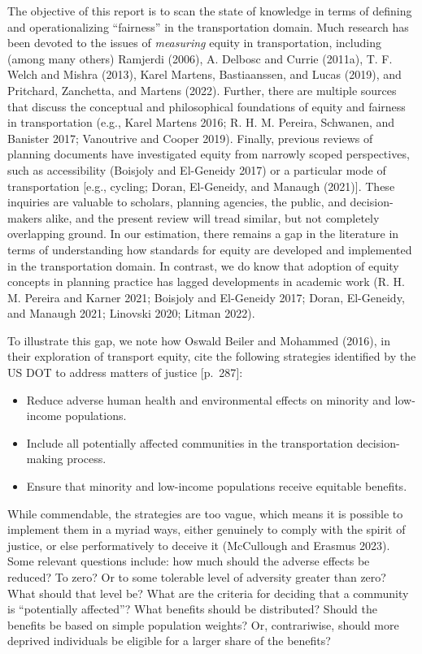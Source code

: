 \documentclass[12pt, oneside]{report}
\providecommand{\tightlist}{%
  \setlength{\itemsep}{0pt}\setlength{\parskip}{0pt}}\usepackage{longtable,booktabs,array}
\begin{document}
The objective of this report is to scan the state of knowledge in terms
of defining and operationalizing ``fairness'' in the transportation
domain. Much research has been devoted to the issues of \emph{measuring}
equity in transportation, including (among many others) Ramjerdi (2006),
A. Delbosc and Currie (2011a), T. F. Welch and Mishra (2013), Karel
Martens, Bastiaanssen, and Lucas (2019), and Pritchard, Zanchetta, and
Martens (2022). Further, there are multiple sources that discuss the
conceptual and philosophical foundations of equity and fairness in
transportation (e.g., Karel Martens 2016; R. H. M. Pereira, Schwanen,
and Banister 2017; Vanoutrive and Cooper 2019). Finally, previous
reviews of planning documents have investigated equity from narrowly
scoped perspectives, such as accessibility (Boisjoly and El-Geneidy
2017) or a particular mode of transportation {[}e.g., cycling; Doran,
El-Geneidy, and Manaugh (2021){]}. These inquiries are valuable to
scholars, planning agencies, the public, and decision-makers alike, and
the present review will tread similar, but not completely overlapping
ground. In our estimation, there remains a gap in the literature in
terms of understanding how standards for equity are developed and
implemented in the transportation domain. In contrast, we do know that
adoption of equity concepts in planning practice has lagged developments
in academic work (R. H. M. Pereira and Karner 2021; Boisjoly and
El-Geneidy 2017; Doran, El-Geneidy, and Manaugh 2021; Linovski 2020;
Litman 2022).

To illustrate this gap, we note how Oswald Beiler and Mohammed (2016),
in their exploration of transport equity, cite the following strategies
identified by the US DOT to address matters of justice {[}p.~287{]}:

\begin{itemize}
\tightlist
\item
  Reduce adverse human health and environmental effects on minority and
  low-income populations.
\item
  Include all potentially affected communities in the transportation
  decision-making process.
\item
  Ensure that minority and low-income populations receive equitable
  benefits.
\end{itemize}

While commendable, the strategies are too vague, which means it is
possible to implement them in a myriad ways, either genuinely to comply
with the spirit of justice, or else performatively to deceive it
(McCullough and Erasmus 2023). Some relevant questions include: how much
should the adverse effects be reduced? To zero? Or to some tolerable
level of adversity greater than zero? What should that level be? What
are the criteria for deciding that a community is ``potentially
affected''? What benefits should be distributed? Should the benefits be
based on simple population weights? Or, contrariwise, should more
deprived individuals be eligible for a larger share of the benefits?
\end{document}
